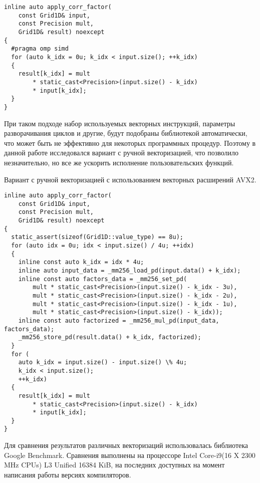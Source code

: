 \begin{lstlisting}[style={CppCodeStyle}]
inline auto apply_corr_factor(
	const Grid1D& input,
	const Precision mult,
	Grid1D& result) noexcept
{
  #pragma omp simd
  for (auto k_idx = 0u; k_idx < input.size(); ++k_idx)
  {
    result[k_idx] = mult 
    	* static_cast<Precision>(input.size() - k_idx)
    	* input[k_idx];
  }
}
\end{lstlisting}

При таком подходе набор используемых векторных инструкций, параметры разворачивания циклов и другие, будут подобраны библиотекой автоматически,
что может быть не эффективно для некоторых программных процедур. Поэтому в данной работе исследовался вариант с ручной векторизацией,
что позволило незначительно, но все же ускорить исполнение пользовательских функций.

Вариант с ручной векторизацией с использованием векторных расширений AVX2.

\begin{lstlisting}[style={CppCodeStyle}]
inline auto apply_corr_factor(
	const Grid1D& input,
	const Precision mult,
	Grid1D& result) noexcept
{
  static_assert(sizeof(Grid1D::value_type) == 8u);
  for (auto idx = 0u; idx < input.size() / 4u; ++idx)
  {
    inline const auto k_idx = idx * 4u;
    inline auto input_data = _mm256_load_pd(input.data() + k_idx);
    inline const auto factors_data = _mm256_set_pd(
        mult * static_cast<Precision>(input.size() - k_idx - 3u),
        mult * static_cast<Precision>(input.size() - k_idx - 2u),
        mult * static_cast<Precision>(input.size() - k_idx - 1u),
        mult * static_cast<Precision>(input.size() - k_idx));
    inline const auto factorized = _mm256_mul_pd(input_data, factors_data);
    _mm256_store_pd(result.data() + k_idx, factorized);
  }
  for (
  	auto k_idx = input.size() - input.size() \% 4u;
  	k_idx < input.size();
  	++k_idx) 
  {
    result[k_idx] = mult
    	* static_cast<Precision>(input.size() - k_idx)
    	* input[k_idx];
  }
}
\end{lstlisting}

Для сравнения результатов различных векторизаций использовалась библиотека Google Benchmark.
Сравнения выполнены на процессоре Intel Core-i9(16 X 2300 MHz CPUs) L3 Unified 16384 KiB, на последних доступных
на момент написания работы версиях компиляторов.


